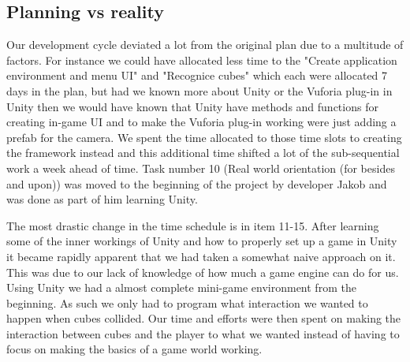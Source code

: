 \subsection{Planning vs reality}%
Our development cycle deviated a lot from the original plan due to a multitude of factors.
For instance we could have allocated less time to the "Create application environment and menu UI" and "Recognice cubes" which each were allocated 7 days in the plan, but had we known more about Unity or the Vuforia plug-in in Unity then we would have known that Unity have methods and functions for creating in-game UI and to make the Vuforia plug-in working were just adding a \gls{prefab} for the camera.
We spent the time allocated to those time slots to creating the framework instead and this additional time shifted a lot of the sub-sequential work a week ahead of time.
Task number 10 (Real world orientation (for besides and upon)) was moved to the beginning of the project by developer Jakob and was done as part of him learning Unity.

The most drastic change in the time schedule is in item 11-15.
After learning some of the inner workings of Unity and how to properly set up a game in Unity it became rapidly apparent that we had taken a somewhat naive approach on it. This was due to our lack of knowledge of how much a game engine can do for us.
Using Unity we had a almost complete mini-game environment from the beginning. As such we only had to program what interaction we wanted to happen when cubes collided.
Our time and efforts were then spent on making the interaction between cubes and the player to what we wanted instead of having to focus on making the basics of a game world working.